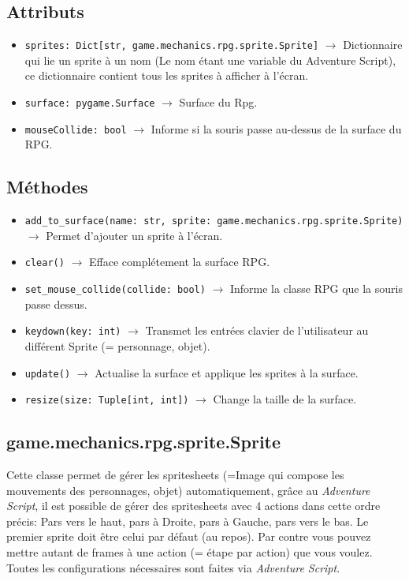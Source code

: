 \documentclass{report}
\begin{document}
\subsection*{Attributs}
\begin{itemize}
  \item \texttt{sprites: Dict[str, game.mechanics.rpg.sprite.Sprite]}	$\rightarrow$ Dictionnaire qui lie un sprite à un nom (Le nom étant une variable du Adventure Script), ce dictionnaire contient tous les sprites à afficher à l’écran.
  \item \texttt{surface: pygame.Surface}	$\rightarrow$ Surface du Rpg.
  \item \texttt{mouseCollide: bool} $\rightarrow$ Informe si la souris passe au-dessus de la surface du RPG.
\end{itemize}

\subsection*{Méthodes}
\begin{itemize}
  \item \texttt{add_to_surface(name: str, sprite: game.mechanics.rpg.sprite.Sprite)}	$\rightarrow$ Permet d’ajouter un sprite à l’écran.

  \item \texttt{clear()} $\rightarrow$ Efface complétement la surface RPG.

  \item \texttt{set_mouse_collide(collide: bool)} $\rightarrow$ Informe la classe RPG que la souris passe dessus.

  \item \texttt{keydown(key: int)} $\rightarrow$ Transmet les entrées clavier de l'utilisateur au différent Sprite (= personnage, objet).

  \item \texttt{update()}	$\rightarrow$  Actualise la surface et applique les sprites à la surface.
  \item \texttt{resize(size: Tuple[int, int])}	$\rightarrow$ Change la taille de la surface.
\end{itemize}
\newpage

\subsection {game.mechanics.rpg.sprite.Sprite}
Cette classe permet de gérer les spritesheets (=Image qui compose les mouvements des personnages, objet) automatiquement, grâce au \emph{Adventure Script}, il est possible de gérer des spritesheets avec 4 actions dans cette ordre précis: Pars vers le haut, pars à Droite, pars à Gauche,  pars vers le bas. Le premier sprite doit être celui par défaut (au repos). Par contre vous pouvez mettre autant de frames à une action (= étape par action) que vous voulez. Toutes les configurations nécessaires sont faites via \emph{Adventure Script}.
\end{document}
